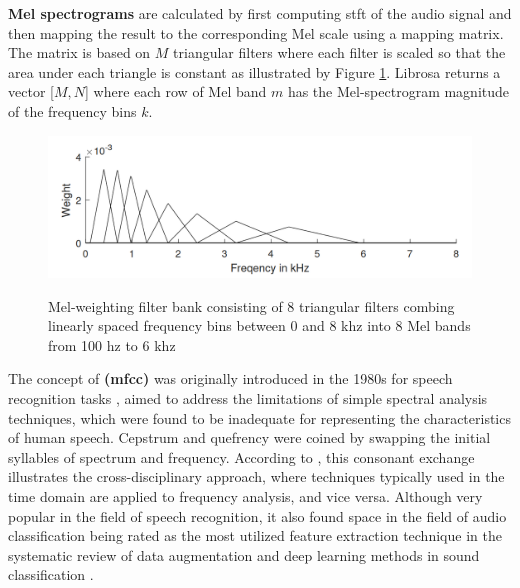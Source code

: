 \textbf{Mel spectrograms} are calculated by first computing \gls{stft} of the audio signal and then mapping the result to the corresponding Mel scale using a mapping matrix. The matrix is based on $M$ triangular filters where each filter is scaled so that the area under each triangle is constant as illustrated by Figure \ref{fig:frmwk_spectral_features_mel_filter_bank}. Librosa \cite{McFee2015librosa_sw} returns a vector [$M, N$] where each row of Mel band $m$ has the Mel-spectrogram magnitude of the frequency bins $k$.

\begin{figure}[htbp]
    \raggedright
        \caption{Mel-weighting filter bank consisting of 8 triangular filters combing linearly spaced frequency bins between 0 and 8 \gls{k}\gls{hz} into 8 Mel bands from 100 \gls{hz} to 6 \gls{k}\gls{hz}}
        \includegraphics[width=.75\textwidth]{resources/images/030-theoretical_framework/Framework_spectral_features_log-mel_filter_bank.png}
        \label{fig:frmwk_spectral_features_mel_filter_bank}
\end{figure}





The concept of \textbf{ (\gls{mfcc})} was originally introduced in the 1980s for speech recognition tasks \cite{DavisMermelstein1980}, aimed to address the limitations of simple spectral analysis techniques, which were found to be inadequate for representing the characteristics of human speech. Cepstrum and quefrency were coined by swapping the initial syllables of spectrum and frequency. According to \textcite{Oppenheim2004}, this consonant exchange illustrates the cross-disciplinary approach, where techniques typically used in the time domain are applied to frequency analysis, and vice versa. Although very popular in the field of speech recognition, it also found space in the field of audio classification being rated as the most utilized feature extraction technique in the systematic review of data augmentation and deep learning methods in sound classification \cite{Alli2022}.

